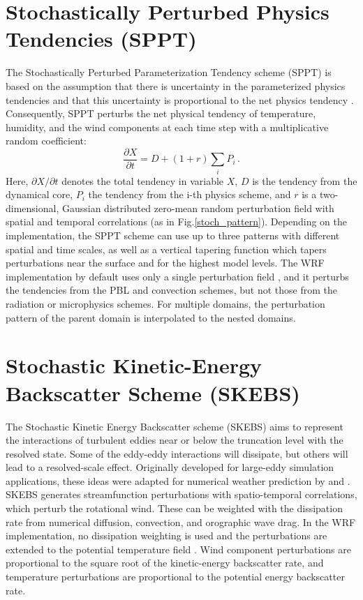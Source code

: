 \section {Stochastically Perturbed Physics Tendencies (SPPT)}
The Stochastically Perturbed Parameterization Tendency scheme
(SPPT) is based on the assumption that there is uncertainty
in the parameterized physics tendencies and that this 
uncertainty is proportional to the net physics tendency \citep{Bu99,Pa09}.
Consequently, SPPT perturbs the net physical tendency of temperature, 
humidity, and the wind components at each time step with a multiplicative 
random coefficient:
\begin{equation}
   \frac{\partial X}{\partial t}= D + (1+ r) \sum_i P_i \,.
\end{equation}
Here, ${\partial X}/{\partial t}$ denotes the total tendency in variable $X$, 
$D$ is the tendency from the dynamical core, 
$P_i$ the tendency from the i-th physics scheme, 
and $r$ is a two-dimensional, Gaussian distributed zero-mean random
perturbation field with spatial and temporal correlations (as in Fig.\ref{stoch_pattern}).
Depending on
the implementation, the SPPT scheme can use up to three patterns with
different spatial and time scales, as well as a vertical tapering function which 
tapers perturbations near the surface and for the highest model levels.
The WRF implementation by default uses only a single perturbation field \citep{Be15},
and it perturbs the tendencies from the PBL and convection schemes, but not those from 
the radiation or microphysics schemes. For multiple domains, the perturbation pattern of the 
parent domain is interpolated to the nested domains.

\section{Stochastic Kinetic-Energy Backscatter Scheme (SKEBS)}
The Stochastic Kinetic Energy Backscatter scheme (SKEBS) aims to represent
the interactions of turbulent eddies near or below the
truncation level with the resolved state. Some of the eddy-eddy interactions
will dissipate, but others will lead to a resolved-scale effect.
Originally developed for large-eddy simulation applications, these ideas were 
adapted for numerical weather prediction by
\citet{Sh05} and \citet{Be09}.
SKEBS generates streamfunction perturbations with spatio-temporal
correlations, which perturb the rotational wind. These can be weighted
with the dissipation rate from numerical diffusion, convection, and
orographic wave drag.
In the WRF implementation, no dissipation weighting is used and the 
perturbations are extended to the potential temperature field \citep{Be11}.
Wind component perturbations are proportional to the square
root of the kinetic-energy backscatter rate, and temperature
perturbations are proportional to the potential energy backscatter rate.

